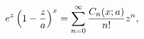 \[e^{z}\left(1-\frac{z}{a}\right)^{x}=\sum_{n=0}^{\infty}\frac{\mathop{C_{n}\/}%
\nolimits\!\left(x;a\right)}{n!}z^{n},\]